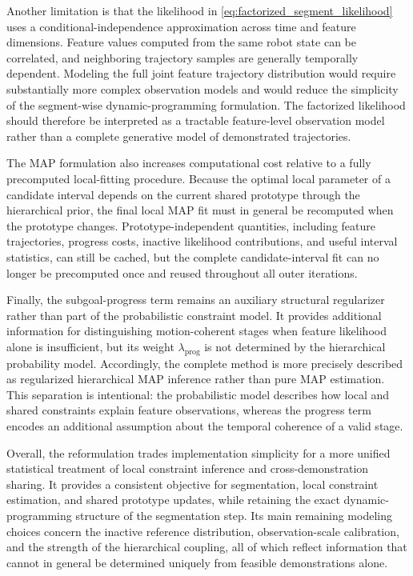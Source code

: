 \documentclass[lettersize,journal]{IEEEtran}
\begin{document}
Another limitation is that the likelihood in
\eqref{eq:factorized_segment_likelihood} uses a conditional-independence
approximation across time and feature dimensions. Feature values computed from
the same robot state can be correlated, and neighboring trajectory samples are
generally temporally dependent. Modeling the full joint feature trajectory
distribution would require substantially more complex observation models and
would reduce the simplicity of the segment-wise dynamic-programming
formulation. The factorized likelihood should therefore be interpreted as a
tractable feature-level observation model rather than a complete generative
model of demonstrated trajectories.

The MAP formulation also increases computational cost relative to a fully
precomputed local-fitting procedure. Because the optimal local parameter of a
candidate interval depends on the current shared prototype through the
hierarchical prior, the final local MAP fit must in general be recomputed when
the prototype changes. Prototype-independent quantities, including feature
trajectories, progress costs, inactive likelihood contributions, and useful
interval statistics, can still be cached, but the complete candidate-interval
fit can no longer be precomputed once and reused throughout all outer
iterations.

Finally, the subgoal-progress term remains an auxiliary structural
regularizer rather than part of the probabilistic constraint model. It provides
additional information for distinguishing motion-coherent stages when feature
likelihood alone is insufficient, but its weight
$\lambda_{\mathrm{prog}}$ is not determined by the hierarchical probability
model. Accordingly, the complete method is more precisely described as
regularized hierarchical MAP inference rather than pure MAP estimation.
This separation is intentional: the probabilistic model describes how local and
shared constraints explain feature observations, whereas the progress term
encodes an additional assumption about the temporal coherence of a valid stage.

Overall, the reformulation trades implementation simplicity for a more unified
statistical treatment of local constraint inference and cross-demonstration
sharing. It provides a consistent objective for segmentation, local constraint
estimation, and shared prototype updates, while retaining the exact
dynamic-programming structure of the segmentation step. Its main remaining
modeling choices concern the inactive reference distribution, observation-scale
calibration, and the strength of the hierarchical coupling, all of which reflect
information that cannot in general be determined uniquely from feasible
demonstrations alone.



% 
\end{document}
